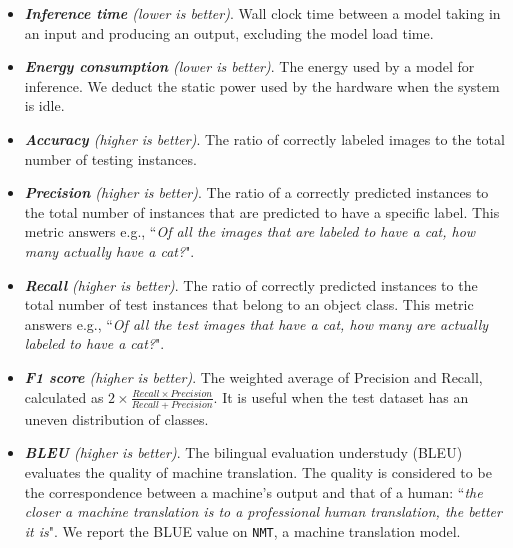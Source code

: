 \begin{itemize}
\item \emph{\textbf{Inference time} (lower is better)}. Wall clock time between a model taking in an input and producing an output,
    excluding the model load time.

\item \emph{\textbf{Energy consumption} (lower is better)}. The energy used by a model for inference.  We deduct the static power used by
    the hardware when the system is idle.

\item \emph{\textbf{Accuracy} (higher is better)}. The ratio of correctly labeled images to the total number of testing instances.

\item \emph{\textbf{Precision} (higher is better)}. The ratio of a correctly predicted instances to the total number of instances that
    are predicted to have a specific label. This metric answers e.g., ``\emph{Of all the images that are labeled to have a cat, how many
    actually have a cat?}".

\item \emph{\textbf{Recall} (higher is better)}. The ratio of correctly predicted instances to the total number of test instances that
    belong to an object class. This metric answers e.g., ``\emph{Of all the test images that have a cat, how many are actually labeled to
    have a cat?}".

\item \emph{\textbf{F1 score} (higher is better)}.  The weighted average of Precision and Recall, calculated as $2\times\frac{Recall
    \times Precision} {Recall + Precision}$. It is useful when the test dataset has an uneven distribution of classes.

\item \emph{\textbf{BLEU} (higher is better)}. The bilingual evaluation understudy (BLEU) evaluates the quality of machine translation.
    The quality is considered to be the correspondence between a machine's output and that of a human: ``\emph{the closer a machine
    translation is to a professional human translation, the better it is}". We report the BLUE value on \texttt{NMT}, a machine
    translation model.


\end{itemize}

